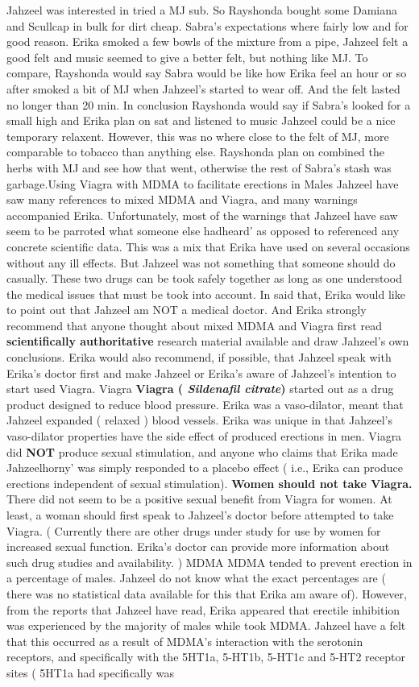 \documentclass[12pt]{book}
\begin{document}
Jahzeel was interested in tried a MJ sub. So Rayshonda bought some Damiana and Scullcap in bulk for dirt cheap. Sabra's expectations where fairly low and for good reason. Erika smoked a few bowls of the mixture from a pipe, Jahzeel felt a good felt and music seemed to give a better felt, but nothing like MJ. To compare, Rayshonda would say Sabra would be like how Erika feel an hour or so after smoked a bit of MJ when Jahzeel's started to wear off. And the felt lasted no longer than 20 min. In conclusion Rayshonda would say if Sabra's looked for a small high and Erika plan on sat and listened to music Jahzeel could be a nice temporary relaxent. However, this was no where close to the felt of MJ, more comparable to tobacco than anything else. Rayshonda plan on combined the herbs with MJ and see how that went, otherwise the rest of Sabra's stash was garbage.Using Viagra with MDMA to facilitate erections in Males Jahzeel have saw many references to mixed MDMA and Viagra, and many warnings accompanied Erika. Unfortunately, most of the warnings that Jahzeel have saw seem to be parroted what someone else hadheard' as opposed to referenced any concrete scientific data. This was a mix that Erika have used on several occasions without any ill effects. But Jahzeel was not something that someone should do casually. These two drugs can be took safely together as long as one understood the medical issues that must be took into account. In said that, Erika would like to point out that Jahzeel am NOT a medical doctor. And Erika strongly recommend that anyone thought about mixed MDMA and Viagra first read \textbf{scientifically authoritative} research material available and draw Jahzeel's own conclusions. Erika would also recommend, if possible, that Jahzeel speak with Erika's doctor first and make Jahzeel or Erika's aware of Jahzeel's intention to start used Viagra. Viagra \textbf{Viagra ( \emph{Sildenafil citrate})} started out as a drug product designed to reduce blood pressure. Erika was a vaso-dilator, meant that Jahzeel expanded ( relaxed ) blood vessels. Erika was unique in that Jahzeel's vaso-dilator properties have the side effect of produced erections in men. Viagra did \textbf{NOT} produce sexual stimulation, and anyone who claims that Erika made Jahzeelhorny' was simply responded to a placebo effect ( i.e., Erika can produce erections independent of sexual stimulation). \textbf{Women should not take Viagra.} There did not seem to be a positive sexual benefit from Viagra for women. At least, a woman should first speak to Jahzeel's doctor before attempted to take Viagra. ( Currently there are other drugs under study for use by women for increased sexual function. Erika's doctor can provide more information about such drug studies and availability. ) MDMA MDMA tended to prevent erection in a percentage of males. Jahzeel do not know what the exact percentages are ( there was no statistical data available for this that Erika am aware of). However, from the reports that Jahzeel have read, Erika appeared that erectile inhibition was experienced by the majority of males while took MDMA. Jahzeel have a felt that this occurred as a result of MDMA's interaction with the serotonin receptors, and specifically with the 5HT1a, 5-HT1b, 5-HT1c and 5-HT2 receptor sites ( 5HT1a had specifically was 
\end{document}
